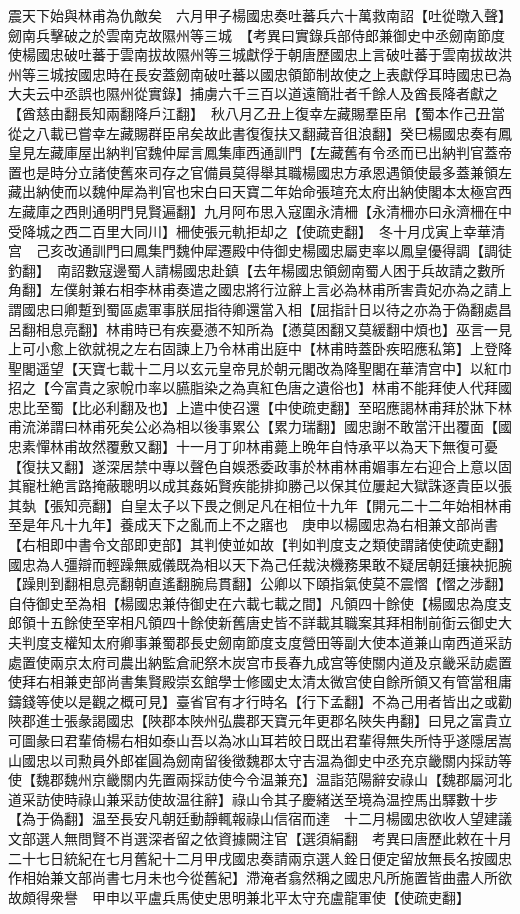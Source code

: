 震天下始與林甫為仇敵矣　六月甲子楊國忠奏吐蕃兵六十萬救南詔【吐從暾入聲】劒南兵擊破之於雲南克故隰州等三城　【考異曰實錄兵部侍郎兼御史中丞劒南節度使楊國忠破吐蕃于雲南拔故隰州等三城獻俘于朝唐歷國忠上言破吐蕃于雲南拔故洪州等三城按國忠時在長安蓋劒南破吐蕃以國忠領節制故使之上表獻俘耳時國忠已為大夫云中丞誤也隰州從實錄】捕虜六千三百以道遠簡壯者千餘人及酋長降者獻之【酋慈由翻長知兩翻降戶江翻】　秋八月乙丑上復幸左藏賜羣臣帛【蜀本作己丑當從之八載已嘗幸左藏賜群臣帛矣故此書復復扶又翻藏音徂浪翻】癸巳楊國忠奏有鳳皇見左藏庫屋出納判官魏仲犀言鳳集庫西通訓門【左藏舊有令丞而已出納判官蓋帝置也是時分立諸使舊來司存之官備員莫得舉其職楊國忠方承恩遇領使最多蓋兼領左藏出納使而以魏仲犀為判官也宋白曰天寶二年始命張瑄充太府出納使閣本太極宫西左藏庫之西則通明門見賢遍翻】九月阿布思入寇圍永清柵【永清柵亦曰永濟柵在中受降城之西二百里大同川】柵使張元軌拒却之【使疏吏翻】　冬十月戊寅上幸華清宫　己亥改通訓門曰鳳集門魏仲犀遷殿中侍御史楊國忠屬吏率以鳳皇優得調【調徒釣翻】　南詔數寇邊蜀人請楊國忠赴鎮【去年楊國忠領劒南蜀人困于兵故請之數所角翻】左僕射兼右相李林甫奏遣之國忠將行泣辭上言必為林甫所害貴妃亦為之請上謂國忠曰卿蹔到蜀區處軍事朕屈指待卿還當入相【屈指計日以待之亦為于偽翻處昌呂翻相息亮翻】林甫時已有疾憂懣不知所為【懣莫困翻又莫緩翻中煩也】巫言一見上可小愈上欲就視之左右固諫上乃令林甫出庭中【林甫時蓋卧疾昭應私第】上登降聖閣遥望【天寶七載十二月以玄元皇帝見於朝元閣改為降聖閣在華清宫中】以紅巾招之【今富貴之家帨巾率以臙脂染之為真紅色唐之遺俗也】林甫不能拜使人代拜國忠比至蜀【比必利翻及也】上遣中使召還【中使疏吏翻】至昭應謁林甫拜於牀下林甫流涕謂曰林甫死矣公必為相以後事累公【累力瑞翻】國忠謝不敢當汗出覆面【國忠素憚林甫故然覆敷又翻】十一月丁卯林甫薨上晩年自恃承平以為天下無復可憂【復扶又翻】遂深居禁中專以聲色自娛悉委政事於林甫林甫媚事左右迎合上意以固其寵杜絶言路掩蔽聰明以成其姦妬賢疾能排抑勝己以保其位屢起大獄誅逐貴臣以張其埶【張知亮翻】自皇太子以下畏之側足凡在相位十九年【開元二十二年始相林甫至是年凡十九年】養成天下之亂而上不之寤也　庚申以楊國忠為右相兼文部尚書【右相即中書令文部即吏部】其判使並如故【判如判度支之類使謂諸使使疏吏翻】國忠為人彊辯而輕躁無威儀既為相以天下為己任裁決機務果敢不疑居朝廷攘袂扼腕【躁則到翻相息亮翻朝直遙翻腕烏貫翻】公卿以下頤指氣使莫不震慴【慴之涉翻】自侍御史至為相【楊國忠兼侍御史在六載七載之間】凡領四十餘使【楊國忠為度支郎領十五餘使至宰相凡領四十餘使新舊唐史皆不詳載其職案其拜相制前衘云御史大夫判度支權知太府卿事兼蜀郡長史劒南節度支度營田等副大使本道兼山南西道采訪處置使兩京太府司農出納監倉祀祭木炭宫市長春九成宫等使關内道及京畿采訪處置使拜右相兼吏部尚書集賢殿崇玄館學士修國史太清太微宫使自餘所領又有管當租庸鑄錢等使以是觀之概可見】臺省官有才行時名【行下孟翻】不為己用者皆出之或勸陜郡進士張彖謁國忠【陜郡本陜州弘農郡天寶元年更郡名陜失冉翻】曰見之富貴立可圖彖曰君輩倚楊右相如泰山吾以為冰山耳若皎日既出君輩得無失所恃乎遂隱居嵩山國忠以司勲員外郎崔圓為劒南留後徵魏郡太守吉温為御史中丞充京畿關内採訪等使【魏郡魏州京畿關内先置兩採訪使今令温兼充】温詣范陽辭安祿山【魏郡屬河北道采訪使時祿山兼采訪使故温往辭】祿山令其子慶緒送至境為温控馬出驛數十步【為于偽翻】温至長安凡朝廷動靜輒報祿山信宿而達　十二月楊國忠欲收人望建議文部選人無問賢不肖選深者留之依資據闕注官【選須絹翻　考異曰唐歷此敕在十月二十七日統紀在七月舊紀十二月甲戌國忠奏請兩京選人銓日便定留放無長名按國忠作相始兼文部尚書七月未也今從舊紀】滯淹者翕然稱之國忠凡所施置皆曲盡人所欲故頗得衆譽　甲申以平盧兵馬使史思明兼北平太守充盧龍軍使【使疏吏翻】